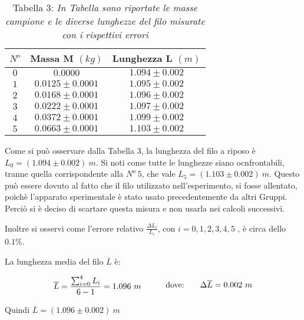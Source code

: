 \documentclass[12pt, a4paper]{article}
\begin{document}
\begin{table}[!htb]
    \centering
        \begin{tabular}{|c|c|c|}
            \hline
            $N^o$ &Massa M $(kg)$&Lunghezza L $(m)$\\
            \hline
            $0$ & $0.0000$         &$1.094\pm0.002$\\
            $1$ & $0.0125\pm0.0001$&$1.095\pm0.002$\\
            $2$ & $0.0168\pm0.0001$&$1.096\pm0.002$\\
            $3$ & $0.0222\pm0.0001$&$1.097\pm0.002$\\
            $4$ & $0.0372\pm0.0001$&$1.099\pm0.002$\\
            $5$ & $0.0663\pm0.0001$&$1.103\pm0.002$\\
           
            \hline
        \end{tabular}
        \label{Tab Lunghezze}
        \caption*{\centering Tabella 3: \textit{\footnotesize In Tabella sono riportate le masse campione e le diverse lunghezze del filo misurate con i rispettivi errori }}
        \end{table}


Come si può osservare dalla Tabella 3, la lunghezza del filo a riposo è $L_0=(1.094\pm0.002)\ m$. Si noti come tutte le lunghezze siano ocnfrontabili, tranne quella corrispondente alla $N^o\ 5$, che vale $L_5=(1.103\pm0.002)\ m$. Questo può essere dovuto al fatto che il filo utilizzato nell'esperimento, si fosse allentato, poichè l'apparato sperimentale è stato usato precedentemente da altri Gruppi. 
Perciò si è deciso di scartare questa misura e non usarla nei calcoli successivi. 

Inoltre si osservi come l'errore relativo $\displaystyle \frac{\Delta L_i}{L_i}$, con $i={0,1,2,3,4,5}$ , è circa dello $0.1\%$.

La lunghezza media del filo $\overline{L}$ è:

\begin{equation*}
\begin{aligned}
  & & \overline{L}=\frac{\sum_{i=0}^{4}L_i}{6-1}=1.096\ m
  &\quad{} 
  \end{aligned}
  \begin{aligned}
  & &\text{dove:\phantom{.......}} \Delta \overline{L}=0.002\ m
  &
  \end{aligned}
\end{equation*}
\bigskip

Quindi $\overline{L}=(1.096\pm0.002)\ m$
\end{document}

